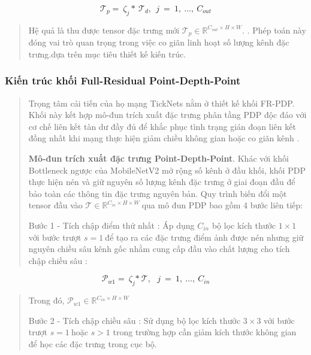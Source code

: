 \documentclass[
]{article}
\begin{document}
\[\mathcal{T}_{p} = \ \zeta_{j}*\ \mathcal{T}_{d},\ \ j\  = \ 1,\ \ldots,\ C_{out}\]

\begin{quote}
Hệ quả là thu được tensor đặc trưng mới
\(\mathcal{T}_{p} \in \mathbb{R}^{C_{out} \times H \times W}\). . Phép
toán này đóng vai trò quan trọng trong việc co giãn linh hoạt số lượng
kênh đặc trưng.dựa trên mục tiêu thiết kế kiến trúc.
\end{quote}

\hypertarget{kiux1ebfn-truxfac-khux1ed1i-full-residual-point-depth-point}{%
\subsubsection{Kiến trúc khối Full-Residual
Point-Depth-Point}\label{kiux1ebfn-truxfac-khux1ed1i-full-residual-point-depth-point}}

\begin{quote}
Trọng tâm cải tiến của họ mạng TickNets nằm ở thiết kế khối FR-PDP. Khối
này kết hợp mô-đun trích xuất đặc trưng phân tầng PDP độc đáo với cơ chế
liên kết tàn dư đầy đủ để khắc phục tình trạng gián đoạn liên kết đồng
nhất khi mạng thực hiện giảm chiều không gian hoặc co giãn kênh .

\textbf{Mô-đun trích xuất đặc trưng Point-Depth-Point}. Khác với khối
Bottleneck ngược của MobileNetV2 mở rộng số kênh ở đầu khối, khối PDP
thực hiện nén và giữ nguyên số lượng kênh đặc trưng ở giai đoạn đầu để
bảo toàn các thông tin đặc trưng nguyên bản. Quy trình biến đổi một
tensor đầu vào
\(\mathcal{T \in}\mathbb{R}^{C_{in} \times H \times W}\ \)qua mô đun PDP
bao gồm 4 bước liên tiếp:

Bước 1 - Tích chập điểm thứ nhất : Áp dụng \(C_{in}\) bộ lọc kích thước
\(1 \times 1\) với bước trượt \(s = 1\ \)để tạo ra các đặc trưng điểm
ảnh được nén nhưng giữ nguyên chiều sâu kênh gốc nhằm cung cấp đầu vào
chất lượng cho tích chập chiều sâu :
\end{quote}

\[\mathcal{P}_{w1} = \ \zeta_{j}\mathcal{*\ T,\ \ \ }j\  = \ 1,\ \ldots,\ C_{in}\]

\begin{quote}
Trong đó, \(\mathcal{P}_{w1} \in \mathbb{R}^{C_{in} \times H \times W}\)

Bước 2 - Tích chập chiều sâu : Sử dụng bộ lọc kích thước \(3 \times 3\)
với bước trượt \(s = 1\ \)hoặc \(s > 1\) trong trường hợp cần giảm kích
thước không gian để học các đặc trưng trong cục bộ.
\end{quote}
\end{document}

